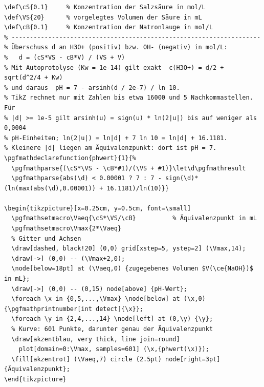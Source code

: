 \begin{lstlisting}[style=latex]
% ---- Versuchsdaten -------------------------------------------------
\def\cS{0.1}     % Konzentration der Salzsäure in mol/L
\def\VS{20}      % vorgelegtes Volumen der Säure in mL
\def\cB{0.1}     % Konzentration der Natronlauge in mol/L
% --------------------------------------------------------------------
% Überschuss d an H3O+ (positiv) bzw. OH- (negativ) in mol/L:
%   d = (cS*VS - cB*V) / (VS + V)
% Mit Autoprotolyse (Kw = 1e-14) gilt exakt  c(H3O+) = d/2 + sqrt(d^2/4 + Kw)
% und daraus  pH = 7 - arsinh(d / 2e-7) / ln 10.
% TikZ rechnet nur mit Zahlen bis etwa 16000 und 5 Nachkommastellen. Für
% |d| >= 1e-5 gilt arsinh(u) = sign(u) * ln(2|u|) bis auf weniger als 0,0004
% pH-Einheiten; ln(2|u|) = ln|d| + 7 ln 10 = ln|d| + 16.1181.
% Kleinere |d| liegen am Äquivalenzpunkt: dort ist pH = 7.
\pgfmathdeclarefunction{phwert}{1}{%
  \pgfmathparse{(\cS*\VS - \cB*#1)/(\VS + #1)}\let\d\pgfmathresult
  \pgfmathparse{abs(\d) < 0.00001 ? 7 : 7 - sign(\d)*(ln(max(abs(\d),0.00001)) + 16.1181)/ln(10)}}

\begin{tikzpicture}[x=0.25cm, y=0.5cm, font=\small]
  \pgfmathsetmacro\Vaeq{\cS*\VS/\cB}          % Äquivalenzpunkt in mL
  \pgfmathsetmacro\Vmax{2*\Vaeq}
  % Gitter und Achsen
  \draw[dashed, black!20] (0,0) grid[xstep=5, ystep=2] (\Vmax,14);
  \draw[->] (0,0) -- (\Vmax+2,0);
  \node[below=18pt] at (\Vaeq,0) {zugegebenes Volumen $V(\ce{NaOH})$ in mL};
  \draw[->] (0,0) -- (0,15) node[above] {pH-Wert};
  \foreach \x in {0,5,...,\Vmax} \node[below] at (\x,0) {\pgfmathprintnumber[int detect]{\x}};
  \foreach \y in {2,4,...,14} \node[left] at (0,\y) {\y};
  % Kurve: 601 Punkte, darunter genau der Äquivalenzpunkt
  \draw[akzentblau, very thick, line join=round]
    plot[domain=0:\Vmax, samples=601] (\x,{phwert(\x)});
  \fill[akzentrot] (\Vaeq,7) circle (2.5pt) node[right=3pt] {Äquivalenzpunkt};
\end{tikzpicture}
\end{lstlisting}

